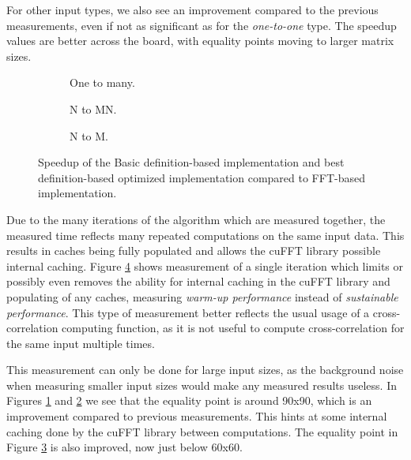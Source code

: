 For other input types, we also see an improvement compared to the previous measurements, even if not as significant as for the \textit{one-to-one} type. The speedup values are better across the board, with equality points moving to larger matrix sizes.

\begin{figure}[ht]
	\centering	

	\begin{subfigure}{0.35\textwidth}
		\centering
		\def\svgwidth{\textwidth}
		
		\caption{One to many.}
		\label{fig:fft_startup_one_to_many}
	\end{subfigure}
	\begin{subfigure}{0.35\textwidth}
		\centering
		\def\svgwidth{\textwidth}
		
		\caption{N to MN.}
		\label{fig:fft_startup_n_to_mn}
	\end{subfigure}
	\begin{subfigure}{0.35\textwidth}
		\centering
		\def\svgwidth{\textwidth}
		
		\caption{N to M.}
		\label{fig:fft_startup_n_to_m}
	\end{subfigure}
	\caption{Speedup of the Basic definition-based implementation and best definition-based optimized implementation compared to FFT-based implementation.}
	\label{fig:fft_startup}
\end{figure}

Due to the many iterations of the algorithm which are measured together, the measured time reflects many repeated computations on the same input data. This results in caches being fully populated and allows the cuFFT library possible internal caching. Figure \ref{fig:fft_startup} shows measurement of a single iteration which limits or possibly even removes the ability for internal caching in the cuFFT library and populating of any caches, measuring \textit{warm-up performance} instead of \textit{sustainable performance}. This type of measurement better reflects the usual usage of a cross-correlation computing function, as it is not useful to compute cross-correlation for the same input multiple times.

This measurement can only be done for large input sizes, as the background noise when measuring smaller input sizes would make any measured results useless. In Figures \ref{fig:fft_startup_one_to_many} and \ref{fig:fft_startup_n_to_mn} we see that the equality point is around 90x90, which is an improvement compared to previous measurements. This hints at some internal caching done by the cuFFT library between computations. The equality point in Figure \ref{fig:fft_startup_n_to_m} is also improved, now just below 60x60.

